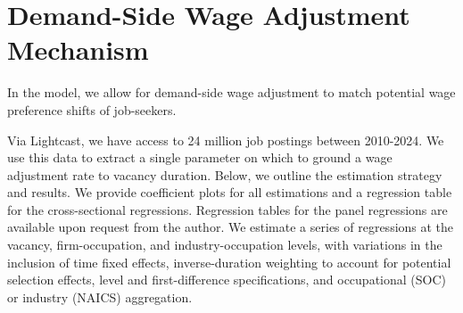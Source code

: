 
\section{Demand-Side Wage Adjustment Mechanism}

In the model, we allow for demand-side wage adjustment to match potential wage preference shifts of job-seekers. 

Via Lightcast, we have access to 24 million job postings between 2010-2024. We use this data to extract a single parameter on which to ground a wage adjustment rate to vacancy duration. Below, we outline the estimation strategy and results. We provide coefficient plots for all estimations and a regression table for the cross-sectional regressions. Regression tables for the panel regressions are available upon request from the author. We estimate a series of regressions at the vacancy, firm-occupation, and industry-occupation levels, with variations in the inclusion of time fixed effects, inverse-duration weighting to account for potential selection effects, level and first-difference specifications, and occupational (SOC) or industry (NAICS) aggregation. 



    
